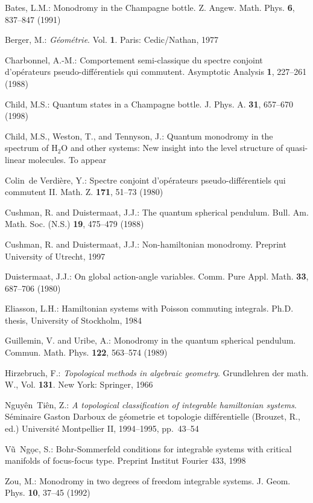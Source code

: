 \documentclass[cmp]{svjour}  %
\begin{document}
\begin{thebibliography}{15}

Bates, L.M.:
{Monodromy in the {C}hampagne bottle}. Z. Angew. Math. Phys.
  \textbf{6}, 837--847 (1991)

Berger, M.: {\it G{\'e}om{\'e}trie}. Vol.  \textbf{1}. Paris:
Cedic/Nathan,   1977

Charbonnel, A.-M.:
{Comportement semi-classique du spectre conjoint
  d'op{\'e}rateurs pseudo-diff{\'e}rentiels qui commutent}. Asymptotic Analysis
  \textbf{1}, 227--261 (1988)

Child, M.S.:
{Quantum states in a {C}hampagne bottle}. J. Phys. A.
  \textbf{31}, 657--670 (1998)

Child, M.S., Weston, T., and Tennyson, J.:
{Quantum monodromy in the   spectrum of {H$_2$O} and other systems: New
insight into the level structure   of quasi-linear molecules}. To appear

Colin~de Verdi\`ere, Y.:
{Spectre conjoint d'op{\'e}rateurs   pseudo-diff{\'e}rentiels qui commutent {II}}.
Math. Z. \textbf{171}, 51--73   (1980)

Cushman, R. and Duistermaat, J.J.:
{The quantum spherical pendulum}.
Bull.   Am. Math. Soc. (N.S.) \textbf{19}, 475--479 (1988)

Cushman, R. and Duistermaat, J.J.:
{Non-hamiltonian monodromy}. Preprint
  University of Utrecht, 1997

Duistermaat, J.J.:
{On global action-angle variables}.
Comm. Pure Appl.   Math. \textbf{33}, 687--706 (1980)

Eliasson, L.H.:
{Hamiltonian systems with {P}oisson commuting integrals}.
  Ph.D. thesis, University of Stockholm, 1984

Guillemin, V. and Uribe, A.:
{Monodromy in the quantum spherical   pendulum}.
Commun. Math. Phys. \textbf{122}, 563--574 (1989)

Hirzebruch, F.:
{\it Topological methods in algebraic geometry}. Grundlehren
  der math. {W}., Vol.  \textbf{131}. New York: Springer, 1966

Nguy{\^e}n~Ti{\^e}n, Z.:
{\it A topological classification of integrable
  hamiltonian systems}. S{\'e}minaire Gaston Darboux de g{\'e}ometrie et
  topologie diff{\'e}rentielle (Brouzet, R., ed.) Universit{\'e} Montpellier II,
  1994--1995, pp.~43--54

V{\~u}~Ng{\d o}c, S.:
{Bohr-{S}ommerfeld conditions for integrable systems
  with critical manifolds of focus-focus type}.
Preprint Institut Fourier 433,   1998

Zou, M.:
{Monodromy in two degrees of freedom integrable systems}.
J.  Geom. Phys. \textbf{10}, 37--45 (1992)

\end{thebibliography}
\end{document}
